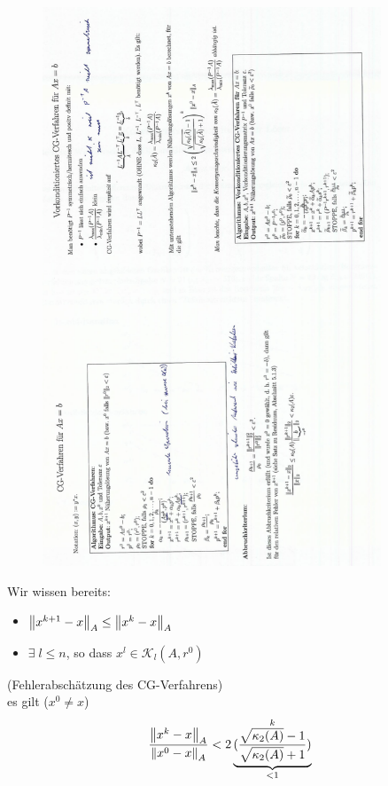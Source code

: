 \begin{figure}
  \centering
  \includegraphics[width=0.9\textwidth]{figures/cg_handout.png}
\end{figure}
Wir wissen bereits:
\begin{itemize}
  \item $\left\lVert x^{k+1} - x \right\rVert_A \leq \left\lVert x^k - x \right\rVert_A$
  \item $\exists\; l \leq n$, so dass $x^l \in \mathcal{K}_l(A,r^0)$
\end{itemize}
\satz (Fehlerabschätzung des CG-Verfahrens)\\
es gilt ($x^0 \neq x$)
\begin{align*}
  \frac{\left\lVert x^k - x \right\rVert_A}{\left\lVert x^0 - x \right\rVert_A} < 2 \underbrace{(\frac{\sqrt{\kappa_2(A)} - 1}{\sqrt{\kappa_2(A)}+1} )}_{<1}^k
\end{align*}
